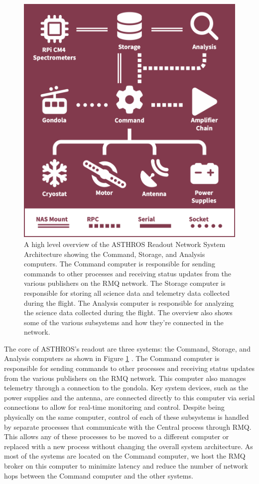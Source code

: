 \begin{figure}
    \centering
    \includegraphics[width=0.5\linewidth]{figs/spectra/system.png}
    \caption[High Level System Diagram for ASTHROS]{A high level overview of the ASTHROS Readout Network System Architecture showing the Command, Storage, and Analysis computers. The Command computer is responsible for sending commands to other processes and receiving status updates from the various publishers on the RMQ network. The Storage computer is responsible for storing all science data and telemetry data collected during the flight. The Analysis computer is responsible for analyzing the science data collected during the flight. The overview also shows some of the various subsystems and how they're connected in the network.}
    \label{spectra/fig:system}
\end{figure}

The core of ASTHROS's readout are three systems: the Command, Storage, and Analysis computers as shown in Figure \ref{spectra/fig:system} \parencite{horton2024readout}.
The Command computer is responsible for sending commands to other processes and receiving status updates from the various publishers on the RMQ network. 
This computer also manages telemetry through a connection to the gondola. 
Key system devices, such as the power supplies and the antenna, are connected directly to this computer via serial connections to allow for real-time monitoring and control.
Despite being physically on the same computer, control of each of these subsystems is handled by separate processes that communicate with the Central process through RMQ.
This allows any of these processes to be moved to a different computer or replaced with a new process without changing the overall system architecture.
As most of the systems are located on the Command computer, we host the RMQ broker on this computer to minimize latency and reduce the number of network hops between the Command computer and the other systems.

